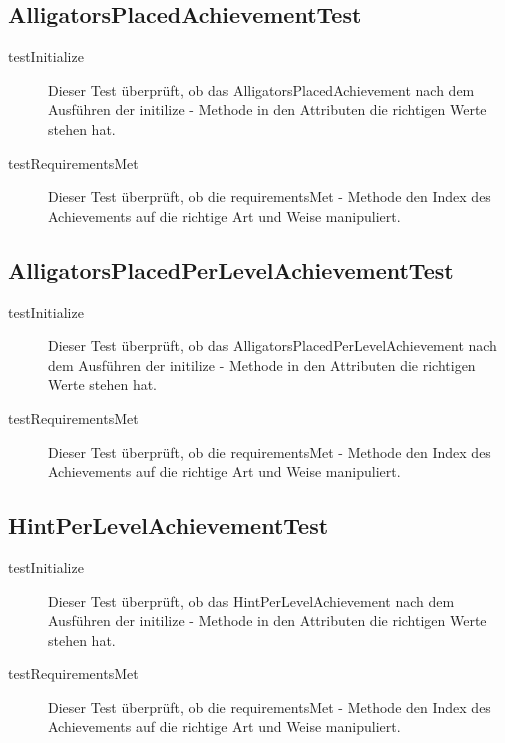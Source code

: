 \subsection{AlligatorsPlacedAchievementTest}

\begin{description}
\item[testInitialize]
Dieser Test überprüft, ob das AlligatorsPlacedAchievement nach dem Ausführen der initilize - Methode in den Attributen die richtigen Werte stehen hat.

\item[testRequirementsMet]
Dieser Test überprüft, ob die requirementsMet - Methode den Index des Achievements auf die richtige Art und Weise manipuliert.

\end{description}

\subsection{AlligatorsPlacedPerLevelAchievementTest}

\begin{description}
\item[testInitialize]
Dieser Test überprüft, ob das AlligatorsPlacedPerLevelAchievement nach dem Ausführen der initilize - Methode in den Attributen die richtigen Werte stehen hat.

\item[testRequirementsMet]
Dieser Test überprüft, ob die requirementsMet - Methode den Index des Achievements auf die richtige Art und Weise manipuliert.

\end{description}

\subsection{HintPerLevelAchievementTest}

\begin{description}
\item[testInitialize]
Dieser Test überprüft, ob das HintPerLevelAchievement nach dem Ausführen der initilize - Methode in den Attributen die richtigen Werte stehen hat.

\item[testRequirementsMet]
Dieser Test überprüft, ob die requirementsMet - Methode den Index des Achievements auf die richtige Art und Weise manipuliert.

\end{description}

